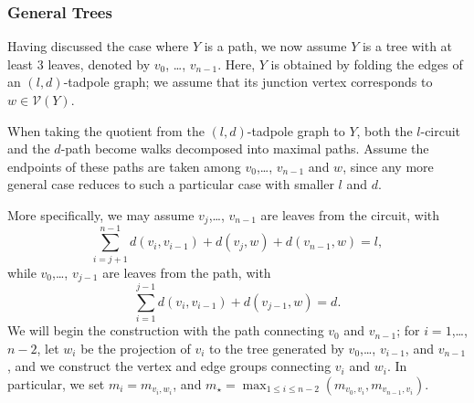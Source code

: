 \documentclass[12pt,leqno]{amsart}
\newcommand{\2}{L^2_{\rm per}(0, T)}
\numberwithin{equation}{section}
\numberwithin{figure}{section}
\begin{document}
\subsubsection{General Trees}
Having discussed the case where $Y$ is a path, we now assume $Y$ is a tree with at least $3$ leaves, denoted by $v_0$, \dots, $v_{n-1}$. Here, $Y$ is obtained by folding the edges of an $(l,d)$-tadpole graph; we assume that its junction vertex corresponds to $w\in\mathcal{V}(Y)$.

When taking the quotient from the $(l,d)$-tadpole graph to $Y$, both the $l$-circuit and the $d$-path become walks decomposed into maximal paths. Assume the endpoints of these paths are taken among $v_0$,\dots, $v_{n-1}$ and $w$, since any more general case reduces to such a particular case with smaller $l$ and $d$. 

More specifically, we may assume $v_{j}$,\dots, $v_{n-1}$ are leaves from the circuit, with
\[
\sum_{i=j+1}^{n-1}d(v_{i},v_{i-1}) + d(v_{j},w) + d(v_{n-1},w) = l,
\]
while $v_0$,\dots, $v_{j-1}$ are leaves from the path, with
\[
\sum_{i=1}^{j-1}d(v_i,v_{i-1}) + d(v_{j-1},w) = d.
\]
We will begin the construction with the path connecting $v_0$ and $v_{n-1}$; for $i=1$,\dots, $n-2$, let $w_i$ be the projection of $v_i$ to the tree generated by $v_0$,\dots, $v_{i-1}$, and $v_{n-1}$, and we construct the vertex and edge groups connecting $v_i$ and $w_i$. In particular, we set $m_i = m_{v_i,w_i}$, and $m_\star = \max_{1\leq i\leq n-2}(m_{v_0,v_i}, m_{v_{n-1},v_i})$.
\end{document}
